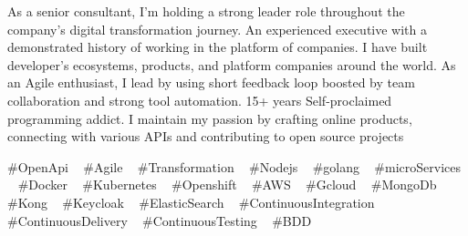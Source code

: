 

\begin{cvparagraph}


As a senior consultant, I'm holding a strong leader role throughout the company's digital transformation journey.
An experienced executive with a demonstrated history of working in the platform of companies. I have built developer's ecosystems, products, and platform companies around the world.
As an Agile enthusiast, I lead by using short feedback loop boosted by team collaboration and strong tool automation.
15+ years Self-proclaimed programming addict. I maintain my passion by crafting online products, connecting with various APIs and contributing to open source projects


\end{cvparagraph}
\begin{cvtechnologies}
 \#OpenApi ~
 \#Agile ~
 \#Transformation ~
 \#Nodejs ~
 \#golang ~
 \#microServices ~
 \#Docker ~
 \#Kubernetes ~
 \#Openshift ~
 \#AWS ~
 \#Gcloud ~
 \#MongoDb ~
 \#Kong ~
 \#Keycloak ~
 \#ElasticSearch ~
 \#ContinuousIntegration ~
 \#ContinuousDelivery ~
 \#ContinuousTesting ~
 \#BDD 
\end{cvtechnologies}
